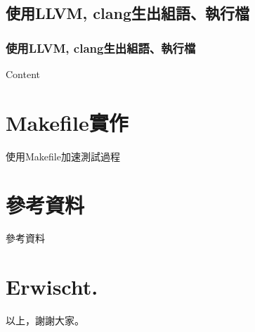 \documentclass{beamer}
\begin{document}
\subsection{使用LLVM, clang生出組語、執行檔}
\begin{frame}
    \frametitle{使用LLVM, clang生出組語、執行檔}
    Content
\end{frame}

\section{Makefile實作}
\begin{frame}{使用Makefile加速測試過程}

\end{frame}

\section{參考資料}
\begin{frame}{參考資料}
    
  
\end{frame}

\section{Erwischt.}
\begin{frame}{以上，謝謝大家。}
    
\end{frame}
\end{document}

